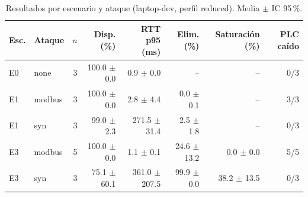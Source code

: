 \begin{table}[htbp]
\centering
\caption{Resultados por escenario y ataque (laptop-dev, perfil reduced). Media $\pm$ IC 95\,\%.}
\label{tab:stats-laptop-dev-reduced}
\scriptsize
\begin{tabular}{l l r r r r r r}
\toprule
Esc. & Ataque & $n$ & Disp. (\%) & RTT p95 (ms) & Elim. (\%) & Saturación (\%) & PLC caído \\
\midrule
E0 & none & 3 & 100.0 $\pm$ 0.0 & 0.9 $\pm$ 0.0 & -- & -- & 0/3 \\
E1 & modbus & 3 & 100.0 $\pm$ 0.0 & 2.8 $\pm$ 4.4 & 0.0 $\pm$ 0.1 & -- & 3/3 \\
E1 & syn & 3 & 99.0 $\pm$ 2.3 & 271.5 $\pm$ 31.4 & 2.5 $\pm$ 1.8 & -- & 0/3 \\
E3 & modbus & 5 & 100.0 $\pm$ 0.0 & 1.1 $\pm$ 0.1 & 24.6 $\pm$ 13.2 & 0.0 $\pm$ 0.0 & 5/5 \\
E3 & syn & 3 & 75.1 $\pm$ 60.1 & 361.0 $\pm$ 207.5 & 99.9 $\pm$ 0.0 & 38.2 $\pm$ 13.5 & 0/3 \\
\bottomrule
\end{tabular}
\end{table}
